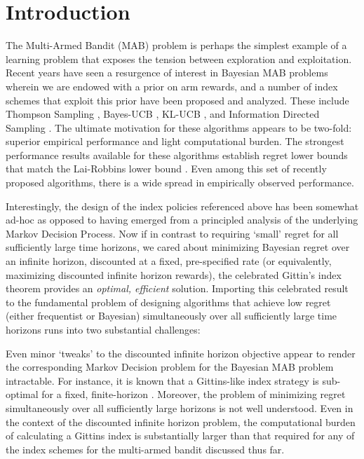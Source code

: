 \section{Introduction} \label{sec:intro}
The Multi-Armed Bandit (MAB) problem is perhaps the simplest example of a learning problem that exposes the tension between exploration and exploitation. Recent years have seen a resurgence of interest in Bayesian MAB problems wherein we are endowed with a prior on arm rewards, and a number of index schemes that exploit this prior have been proposed and analyzed. These include Thompson Sampling \citep{thompson1933likelihood}, Bayes-UCB \citep{kaufmann2012thompson}, KL-UCB \citep{garivier2011kl}, and Information Directed Sampling \citep{russo2014learning}. The ultimate motivation for these algorithms appears to be two-fold: superior empirical performance and light computational burden. The strongest performance results available for these algorithms establish regret lower bounds that match the Lai-Robbins lower bound \citep{lai1985asymptotically}.  Even among this set of recently proposed algorithms, there is a wide spread in empirically observed performance. 

Interestingly, the design of the index policies referenced above has been somewhat ad-hoc as opposed to having emerged from a principled analysis of the underlying Markov Decision Process. Now if in contrast to requiring `small' regret for all sufficiently large time horizons, we cared about minimizing Bayesian regret over an infinite horizon, discounted at a fixed, pre-specified rate (or equivalently, maximizing discounted infinite horizon rewards), the celebrated Gittin's index theorem provides an {\em optimal, efficient} solution. Importing this celebrated result to the fundamental problem of designing algorithms that achieve low regret (either frequentist or Bayesian) simultaneously over all sufficiently large time horizons runs into two substantial challenges:

Even minor `tweaks' to the discounted infinite horizon objective appear to render the corresponding Markov Decision problem for the Bayesian MAB problem intractable. For instance, it is known that a Gittins-like index strategy is sub-optimal for a fixed, finite-horizon \citep{berry1985bandit}. Moreover, the problem of minimizing regret simultaneously over all sufficiently large horizons is not well understood.
\newline
\newline
{}Even in the context of the discounted infinite horizon problem, the computational burden of calculating a Gittins index is substantially larger than that required for any of the index schemes for the multi-armed bandit discussed thus far. 

